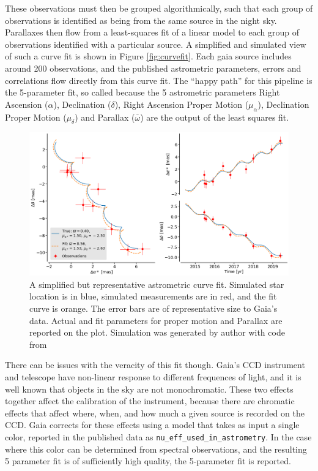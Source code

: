 \documentclass[twocolumn]{aastex631}
\begin{document}
These observations must then be grouped algorithmically, such that each group of observations is identified as being from the same source in the night sky. Parallaxes then flow from a least-squares fit of a linear model to each group of observations identified with a particular source. A simplified and simulated view of such a curve fit is shown in Figure \ref{fig:curvefit}. Each gaia source includes around 200 observations, and the published astrometric parameters, errors and correlations flow directly from this curve fit. The ``happy path'' for this pipeline is the 5-parameter fit, so called because the 5 astrometric parameters Right Ascension ($\alpha$), Declination ($\delta$), Right Ascension Proper Motion ($\mu_\alpha$), Declination Proper Motion ($\mu_\delta$) and Parallax ($\bar{\omega}$) are the output of the least squares fit.\citep{lindegrenGaia2021a}

\begin{figure}
	\includegraphics[width=\columnwidth]{astrometric-good.png}
	\caption{A simplified but representative astrometric curve fit. Simulated star location is in blue, simulated measurements are in red, and the fit curve is orange. The error bars are of representative size to Gaia's data. Actual and fit parameters for proper motion and Parallax are reported on the plot. Simulation was generated by author with code from \cite{luriGaia2018}}
	\label{fig:goodfit}
\end{figure}


There can be issues with the veracity of this fit though. Gaia's CCD instrument and telescope have non-linear response to different frequences of light, and it is well known that objects in the sky are not monochromatic. These two effects together affect the calibration of the instrument, because there are chromatic effects that affect where, when, and how much a given source is recorded on the CCD. Gaia corrects for these effects using a model that takes as input a single color, reported in the published data as \texttt{nu\_eff\_used\_in\_astrometry}. In the case where this color can be determined from spectral observations, and the resulting 5 parameter fit is of sufficiently high quality, the 5-parameter fit is reported.
\end{document}
